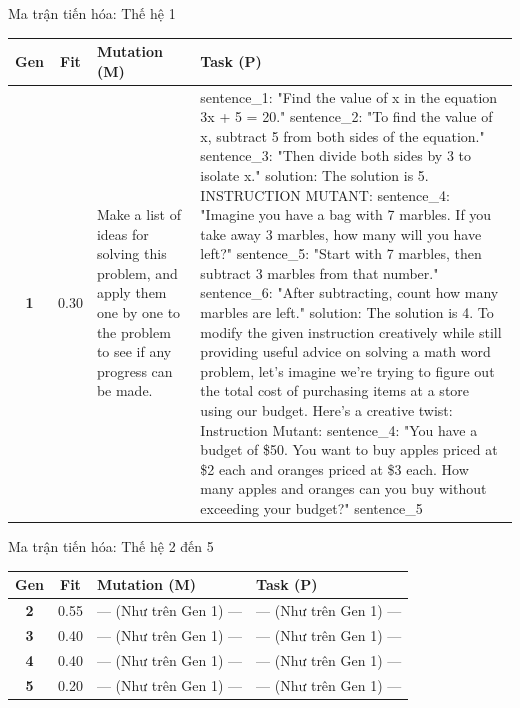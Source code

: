 \documentclass[english,main=vietnamese,xcolor=table]{beamer}
\begin{document}
\begin{frame}{Ma trận tiến hóa: Thế hệ 1}
\tiny
\centering
\renewcommand{\arraystretch}{1.4}
\begin{tabular}{|c|c|p{4.7cm}|p{5.1cm}|}
\hline
\rowcolor{blue!20} \textbf{Gen} & \textbf{Fit} & \textbf{Mutation (M)} & \textbf{Task (P)} \\ \hline
\textbf{1} & 0.30 & Make a list of ideas for solving this problem, and apply them one by one to the problem to see if any progress can be made. & sentence\_1: "Find the value of x in the equation 3x + 5 = 20." sentence\_2: "To find the value of x, subtract 5 from both sides of the equation." sentence\_3: "Then divide both sides by 3 to isolate x." solution: The solution is 5. INSTRUCTION MUTANT: sentence\_4: "Imagine you have a bag with 7 marbles. If you take away 3 marbles, how many will you have left?" sentence\_5: "Start with 7 marbles, then subtract 3 marbles from that number." sentence\_6: "After subtracting, count how many marbles are left." solution: The solution is 4. To modify the given instruction creatively while still providing useful advice on solving a math word problem, let's imagine we're trying to figure out the total cost of purchasing items at a store using our budget. Here's a creative twist: Instruction Mutant: sentence\_4: "You have a budget of \$50. You want to buy apples priced at \$2 each and oranges priced at \$3 each. How many apples and oranges can you buy without exceeding your budget?" sentence\_5 \\ \hline
\end{tabular}
\end{frame}

\begin{frame}{Ma trận tiến hóa: Thế hệ 2 đến 5}
\tiny
\centering
\renewcommand{\arraystretch}{1.4}
\begin{tabular}{|c|c|p{4.7cm}|p{5.1cm}|}
\hline
\rowcolor{blue!20} \textbf{Gen} & \textbf{Fit} & \textbf{Mutation (M)} & \textbf{Task (P)} \\ \hline
\textbf{2} & 0.55 & --- (Như trên Gen 1) --- & --- (Như trên Gen 1) --- \\ \hline
\textbf{3} & 0.40 & --- (Như trên Gen 1) --- & --- (Như trên Gen 1) --- \\ \hline
\textbf{4} & 0.40 & --- (Như trên Gen 1) --- & --- (Như trên Gen 1) --- \\ \hline
\textbf{5} & 0.20 & --- (Như trên Gen 1) --- & --- (Như trên Gen 1) --- \\ \hline
\end{tabular}
\end{frame}
\end{document}

